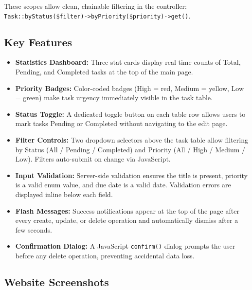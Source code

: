 \documentclass[12pt,a4paper]{report}
\begin{document}
These scopes allow clean, chainable filtering in the controller:
\texttt{Task::byStatus(\$filter)->byPriority(\$priority)->get()}.

\subsection{Key Features}

\begin{itemize}[leftmargin=1.5cm]
    \item \textbf{Statistics Dashboard:} Three stat cards display real-time counts of
    Total, Pending, and Completed tasks at the top of the main page.

    \item \textbf{Priority Badges:} Color-coded badges (High = red, Medium = yellow,
    Low = green) make task urgency immediately visible in the task table.

    \item \textbf{Status Toggle:} A dedicated toggle button on each table row allows
    users to mark tasks Pending or Completed without navigating to the edit page.

    \item \textbf{Filter Controls:} Two dropdown selectors above the task table allow
    filtering by Status (All / Pending / Completed) and Priority (All / High / Medium /
    Low). Filters auto-submit on change via JavaScript.

    \item \textbf{Input Validation:} Server-side validation ensures the title is present,
    priority is a valid enum value, and due date is a valid date. Validation errors are
    displayed inline below each field.

    \item \textbf{Flash Messages:} Success notifications appear at the top of the page
    after every create, update, or delete operation and automatically dismiss after a
    few seconds.

    \item \textbf{Confirmation Dialog:} A JavaScript \texttt{confirm()} dialog prompts
    the user before any delete operation, preventing accidental data loss.
\end{itemize}


\subsection{Website Screenshots}
\end{document}
